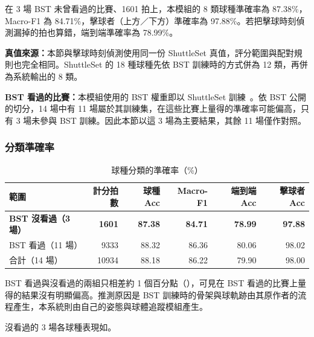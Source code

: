 在 3 場 BST 未曾看過的比賽、1601 拍上，本模組的 8 類球種準確率為 87.38\%，Macro-F1 為 84.71\%，擊球者（上方／下方）準確率為 97.88\%。若把擊球時刻偵測漏掉的拍也算錯，端到端準確率為 78.99\%。

\textbf{真值來源：}本節與擊球時刻偵測使用同一份 ShuttleSet 真值，評分範圍與配對規則也完全相同。ShuttleSet 的 18 種球種先依 BST 訓練時的方式併為 12 類，再併為系統輸出的 8 類。

\textbf{BST 看過的比賽：}本模組使用的 BST 權重即以 ShuttleSet 訓練~\cite{bst}。依 BST 公開的切分，14 場中有 11 場屬於其訓練集，在這些比賽上量得的準確率可能偏高，只有 3 場未參與 BST 訓練。因此本節以這 3 場為主要結果，其餘 11 場僅作對照。

\subsubsection{分類準確率}

\begin{table}[htbp]
  \centering
  \small
  \caption{球種分類的準確率（\%）}
  \label{tab:stroke-accuracy}
  \begin{tabular}{|l|r|r|r|r|r|}
    \hline
    範圍 & 計分拍數 & 球種 Acc & Macro-F1 & 端到端 Acc & 擊球者 Acc \\ \hline
    \textbf{BST 沒看過（3 場）} & \textbf{1601} & \textbf{87.38} & \textbf{84.71} & \textbf{78.99} & \textbf{97.88} \\ \hline
    BST 看過（11 場） & 9333 & 88.32 & 86.36 & 80.06 & 98.02 \\ \hline
    合計（14 場） & 10934 & 88.18 & 86.22 & 79.90 & 98.00 \\ \hline
  \end{tabular}
\end{table}

BST 看過與沒看過的兩組只相差約 1 個百分點（），可見在 BST 看過的比賽上量得的結果沒有明顯偏高。推測原因是 BST 訓練時的骨架與球軌跡由其原作者的流程產生，本系統則由自己的姿態與球體追蹤模組產生。

沒看過的 3 場各球種表現如。

